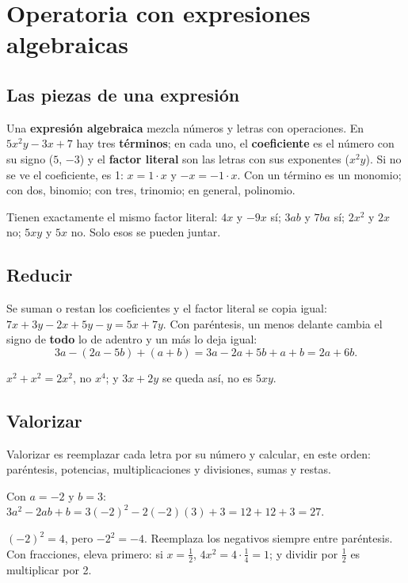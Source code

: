 \section{Operatoria con expresiones algebraicas}

\subsection{Las piezas de una expresión}
Una \textbf{expresión algebraica} mezcla números y letras con operaciones. En $5x^2y - 3x + 7$ hay tres \textbf{términos}; en cada uno, el \textbf{coeficiente} es el número con su signo ($5$, $-3$) y el \textbf{factor literal} son las letras con sus exponentes ($x^2y$). Si no se ve el coeficiente, es 1: $x = 1\cdot x$ y $-x = -1\cdot x$. Con un término es un monomio; con dos, binomio; con tres, trinomio; en general, polinomio.
\begin{clave} Tienen exactamente el mismo factor literal: $4x$ y $-9x$ sí; $3ab$ y $7ba$ sí; $2x^2$ y $2x$ no; $5xy$ y $5x$ no. Solo esos se pueden juntar.\end{clave}

\subsection{Reducir}
Se suman o restan los coeficientes y el factor literal se copia igual: $7x + 3y - 2x + 5y - y = 5x + 7y$. Con paréntesis, un menos delante cambia el signo de \textbf{todo} lo de adentro y un más lo deja igual:
\[ 3a - (2a - 5b) + (a + b) = 3a - 2a + 5b + a + b = 2a + 6b. \]
\begin{ojo} $x^2 + x^2 = 2x^2$, no $x^4$; y $3x + 2y$ se queda así, no es $5xy$.\end{ojo}

\subsection{Valorizar}
Valorizar es reemplazar cada letra por su número y calcular, en este orden: paréntesis, potencias, multiplicaciones y divisiones, sumas y restas.
\begin{ejemplo} Con $a = -2$ y $b = 3$: $3a^2 - 2ab + b = 3(-2)^2 - 2(-2)(3) + 3 = 12 + 12 + 3 = 27$.\end{ejemplo}
\begin{ojo} $(-2)^2 = 4$, pero $-2^2 = -4$. Reemplaza los negativos siempre entre paréntesis. Con fracciones, eleva primero: si $x = \frac{1}{2}$, $4x^2 = 4\cdot\frac{1}{4} = 1$; y dividir por $\frac{1}{2}$ es multiplicar por 2.\end{ojo}

